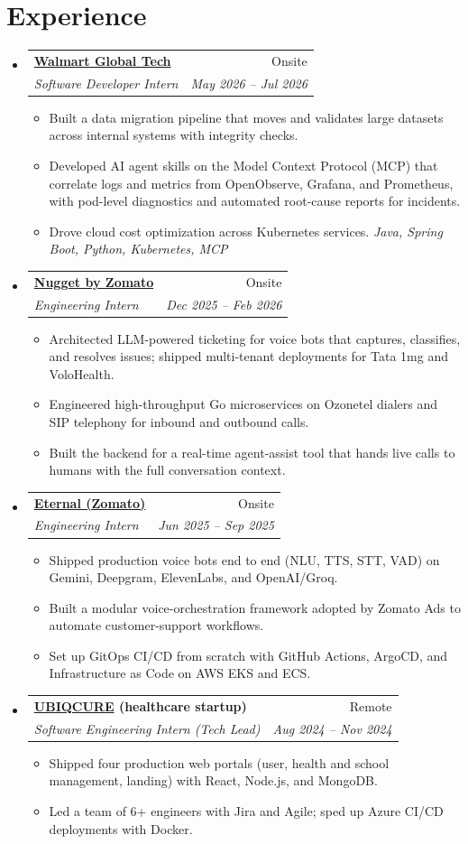 \documentclass[a4paper,10pt]{article}
\makeatletter
\newcommand{\entry}[4]{%
  \item\begin{tabular*}{0.98\textwidth}[t]{l@{\extracolsep{\fill}}r}
    \textbf{#1} & #2 \\
    \textit{\small #3} & \textit{\small #4} \\
  \end{tabular*}\vspace{-6pt}}
\newenvironment{entries}{\begin{itemize}[leftmargin=0.12in,label={},itemsep=1pt,topsep=1pt]}{\end{itemize}}
\newenvironment{points}{\begin{itemize}[leftmargin=0.2in,itemsep=0pt,topsep=1pt,parsep=0pt,label={\tiny$\bullet$}]\small}{\end{itemize}\vspace{-3pt}}
\makeatother
\begin{document}
\section{Experience}
\begin{entries}
  \entry{\href{https://tech.walmart.com}{Walmart Global Tech}}{Onsite}
        {Software Developer Intern}{May 2026 -- Jul 2026}
  \begin{points}
    \item Built a data migration pipeline that moves and validates large datasets across internal systems with integrity checks.
    \item Developed AI agent skills on the Model Context Protocol (MCP) that correlate logs and metrics from OpenObserve, Grafana, and Prometheus, with pod-level diagnostics and automated root-cause reports for incidents.
    \item Drove cloud cost optimization across Kubernetes services. \textit{Java, Spring Boot, Python, Kubernetes, MCP}
  \end{points}

  \entry{\href{https://www.nugget.com}{Nugget by Zomato}}{Onsite}
        {Engineering Intern}{Dec 2025 -- Feb 2026}
  \begin{points}
    \item Architected LLM-powered ticketing for voice bots that captures, classifies, and resolves issues; shipped multi-tenant deployments for Tata 1mg and VoloHealth.
    \item Engineered high-throughput Go microservices on Ozonetel dialers and SIP telephony for inbound and outbound calls.
    \item Built the backend for a real-time agent-assist tool that hands live calls to humans with the full conversation context.
  \end{points}

  \entry{\href{https://www.eternal.com}{Eternal (Zomato)}}{Onsite}
        {Engineering Intern}{Jun 2025 -- Sep 2025}
  \begin{points}
    \item Shipped production voice bots end to end (NLU, TTS, STT, VAD) on Gemini, Deepgram, ElevenLabs, and OpenAI/Groq.
    \item Built a modular voice-orchestration framework adopted by Zomato Ads to automate customer-support workflows.
    \item Set up GitOps CI/CD from scratch with GitHub Actions, ArgoCD, and Infrastructure as Code on AWS EKS and ECS.
  \end{points}

  \entry{\href{https://ubiqcure.com}{UBIQCURE} (healthcare startup)}{Remote}
        {Software Engineering Intern (Tech Lead)}{Aug 2024 -- Nov 2024}
  \begin{points}
    \item Shipped four production web portals (user, health and school management, landing) with React, Node.js, and MongoDB.
    \item Led a team of 6+ engineers with Jira and Agile; sped up Azure CI/CD deployments with Docker.
  \end{points}
\end{entries}
\end{document}
